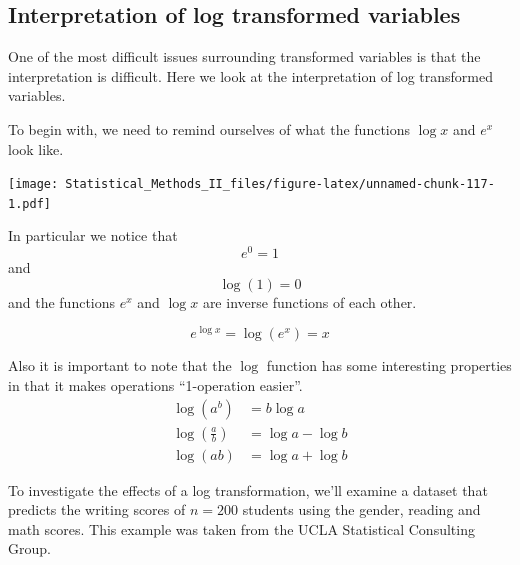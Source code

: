 \documentclass[]{book}
\newenvironment{Shaded}{\begin{snugshade}}{\end{snugshade}}
\newcommand{\KeywordTok}[1]{\textcolor[rgb]{0.13,0.29,0.53}{\textbf{{#1}}}}
\newcommand{\DataTypeTok}[1]{\textcolor[rgb]{0.13,0.29,0.53}{{#1}}}
\newcommand{\StringTok}[1]{\textcolor[rgb]{0.31,0.60,0.02}{{#1}}}
\newcommand{\OtherTok}[1]{\textcolor[rgb]{0.56,0.35,0.01}{{#1}}}
\newcommand{\NormalTok}[1]{{#1}}
\theoremstyle{definition}
\theoremstyle{definition}
\theoremstyle{remark}
\begin{document}
\subsection{Interpretation of log transformed
variables}\label{interpretation-of-log-transformed-variables}

One of the most difficult issues surrounding transformed variables is
that the interpretation is difficult. Here we look at the interpretation
of log transformed variables.

To begin with, we need to remind ourselves of what the functions
\(\log x\) and \(e^{x}\) look like.

\texttt{[image: Statistical\_Methods\_II\_files/figure-latex/unnamed-chunk-117-1.pdf]}

In particular we notice that \[e^{0}=1\] and \[\log\left(1\right)=0\]
and the functions \(e^{x}\) and \(\log x\) are inverse functions of each
other.

\[e^{\log x}=\log\left(e^{x}\right)=x\]

Also it is important to note that the \(\log\) function has some
interesting properties in that it makes operations ``1-operation
easier''. \[\begin{aligned} 
\log\left(a^{b}\right)        &=    b\log a  \\
\log\left(\frac{a}{b}\right)    &=  \log a-\log b \\
\log\left(ab\right)           &=    \log a+\log b
\end{aligned}\]

To investigate the effects of a log transformation, we'll examine a
dataset that predicts the writing scores of \(n=200\) students using the
gender, reading and math scores. This example was taken from the UCLA
Statistical Consulting Group.

\begin{Shaded}
\end{Shaded}
\end{document}
